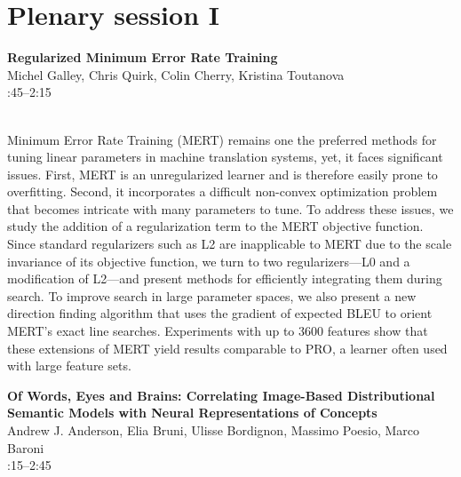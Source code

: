 \documentclass[twoside,makeidx]{book}
\renewcommand{\normalsize}{\fontsize{8}{9}\selectfont}
\renewcommand{\small}{\fontsize{7}{8}\selectfont}
\begin{document}
\section{Plenary session I}
\vspace{-1em}
\par\vspace{2em}\noindent%
\begin{minipage}{\linewidth}%
\begin{center}
\textbf{\normalsize Regularized Minimum Error Rate Training}\\
\normalsize  Michel Galley,  Chris Quirk,  Colin Cherry,  Kristina Toutanova\\
{\small 1:45--2:15}\\
\end{center}
\end{minipage}\\[0.5em]
\nopagebreak%
\noindent%
{\small Minimum Error Rate Training (MERT) remains one the preferred methods for tuning linear parameters in machine translation systems, yet, it faces significant issues. First, MERT is an unregularized learner and is therefore easily prone to overfitting. Second, it incorporates a difficult non-convex optimization problem that becomes intricate with many parameters to tune. To address these issues, we study the addition of a regularization term to the MERT objective function. Since standard regularizers such as L2 are inapplicable to MERT due to the scale invariance of its objective function, we turn to two regularizers---L0 and a modification of L2---and present methods for efficiently integrating them during search. To improve search in large parameter spaces, we also present a new direction finding algorithm that uses the gradient of expected BLEU to orient MERT's exact line searches. Experiments with up to 3600 features show that these extensions of MERT yield results comparable to PRO, a learner often used with large feature sets.}
\par\vspace{2em}\noindent%
\begin{minipage}{\linewidth}%
\begin{center}
\textbf{\normalsize Of Words, Eyes and Brains: Correlating Image-Based Distributional Semantic Models with Neural Representations of Concepts}\\
\normalsize  Andrew J. Anderson,  Elia Bruni,  Ulisse Bordignon,  Massimo Poesio,  Marco Baroni\\
{\small 2:15--2:45}\\
\end{center}
\end{minipage}\\[0.5em]
\end{document}
